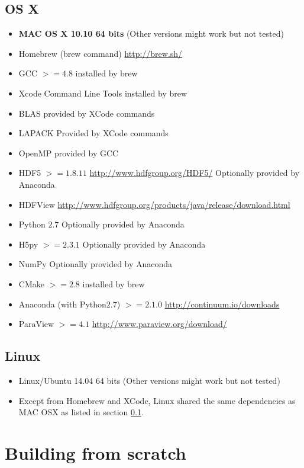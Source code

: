 \documentclass[12pt]{article}
\begin{document}
\subsection{OS X}
\label{mac-deps}
\begin{itemize}
\item \textbf{MAC OS X 10.10 64 bits} (Other versions might work but not tested)
\item Homebrew (brew command) \url{http://brew.sh/}
\item GCC $>= 4.8$ installed by brew
\item Xcode Command Line Tools installed by brew
\item BLAS provided by XCode commands 
\item LAPACK  Provided by XCode commands
\item OpenMP provided by GCC
\item HDF5 $>=1.8.11$  \url{http://www.hdfgroup.org/HDF5/} Optionally provided by Anaconda
\item HDFView \url{http://www.hdfgroup.org/products/java/release/download.html}
\item Python $2.7$ Optionally provided by Anaconda
\item H5py $>= 2.3.1$ Optionally provided by Anaconda
\item NumPy Optionally provided by Anaconda
\item CMake $>= 2.8$ installed by brew 
\item Anaconda (with Python$ 2.7$) $>= 2.1.0$ \url{http://continuum.io/downloads} 
\item ParaView $>=4.1$  \url{http://www.paraview.org/download/}

\end{itemize}

\subsection{Linux}

\begin{itemize}
	\item Linux/Ubuntu 14.04 64 bits (Other versions might work but not tested)
	\item Except from Homebrew and XCode, Linux shared the same dependencies as MAC OSX as listed in section \ref{mac-deps}.
\end{itemize}

\section{Building from scratch}
\end{document}
